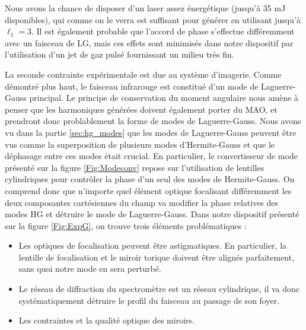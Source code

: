 Nous avons la chance de disposer d'un laser assez énergétique (jusqu'à 35 mJ disponibles), qui comme on le verra est suffisant pour générer en utilisant jusqu'à $\ell_{1}=3$. Il est également probable que l'accord de phase s'effectue différemment avec un faisceau de LG, mais ces effets sont minimisés dans notre dispositif par l'utilisation d'un jet de gaz pulsé fournissant un milieu très fin.

La seconde contrainte expérimentale est due au système d'imagerie. Comme démontré plus haut, le faisceau infrarouge est constitué d'un mode de Laguerre-Gauss principal. Le principe de conservation du moment angulaire nous amène à penser que les harmoniques générées doivent également porter du MAO, et prendront donc problablement la forme de modes de Laguerre-Gauss. Nous avons vu dans la partie \ref{sec:hg_modes} que les modes de Laguerre-Gauss peuvent être vus comme la superposition de plusieurs modes d'Hermite-Gauss et que le déphasage entre ces modes était crucial. En particulier, le convertisseur de mode présenté sur la figure \ref{Fig:Modeconv} repose sur l'utilisation de lentilles cylindriques pour contrôler la phase d'un seul des modes de Hermite-Gauss. On comprend donc que n'importe quel élément optique focalisant différemment les deux composantes cartésiennes du champ va modifier la phase relatives des modes HG et détruire le mode de Laguerre-Gauss. Dans notre dispositif présenté sur la figure \ref{Fig:ExpG}, on trouve trois éléments problématiques :

\begin{itemize}
\item Les optiques de focalisation peuvent être astigmatiques. En particulier, la lentille de focalisation et le miroir torique doivent être alignés parfaitement, sans quoi notre mode en sera perturbé.\\
\item Le réseau de diffraction du spectromètre est un réseau cylindrique, il va donc systématiquement détruire le profil du faisceau au passage de son foyer.\\
\item Les contraintes et la qualité optique des miroirs.
\end{itemize}

